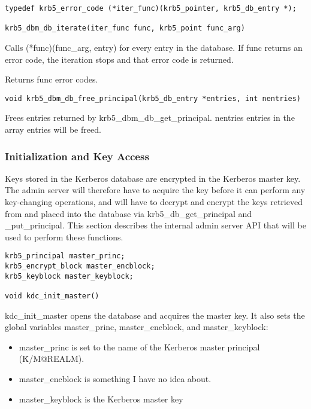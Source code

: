 \begin{verbatim}
typedef krb5_error_code (*iter_func)(krb5_pointer, krb5_db_entry *);

krb5_dbm_db_iterate(iter_func func, krb5_point func_arg)
\end{verbatim}

Calls (*func)(func_arg, entry) for every entry in the database.  If
func returns an error code, the iteration stops and that error code is
returned.

Returns func error codes.

\begin{verbatim}
void krb5_dbm_db_free_principal(krb5_db_entry *entries, int nentries)
\end{verbatim}

Frees entries returned by krb5_dbm_db_get_principal.  nentries entries
in the array entries will be freed.

\subsubsection{Initialization and Key Access}

Keys stored in the Kerberos database are encrypted in the Kerberos
master key.  The admin server will therefore have to acquire the key
before it can perform any key-changing operations, and will have to
decrypt and encrypt the keys retrieved from and placed into the
database via krb5_db_get_principal and _put_principal.  This section
describes the internal admin server API that will be used to perform
these functions.

\begin{verbatim}
krb5_principal master_princ;
krb5_encrypt_block master_encblock;
krb5_keyblock master_keyblock;

void kdc_init_master()
\end{verbatim}

kdc_init_master opens the database and acquires the master key.  It
also sets the global variables master_princ, master_encblock, and
master_keyblock:

\begin{itemize}
\item master_princ is set to the name of the Kerberos master principal
(\v{K/M@REALM}).

\item master_encblock is something I have no idea about.

\item master_keyblock is the Kerberos master key
\end{itemize}

